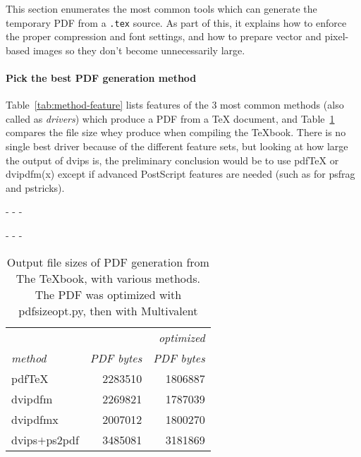 \documentclass{ltugproc}
\def\cmd{\textsf}
\def\pkg{\textsf}
\def\captiontop#1{%
  \advance\abovecaptionskip-\belowcaptionskip
  \advance\belowcaptionskip\abovecaptionskip
  \advance\abovecaptionskip-\belowcaptionskip
  \abovecaptionskip-\abovecaptionskip
  \caption{#1}%
  \advance\abovecaptionskip-\belowcaptionskip
  \advance\belowcaptionskip\abovecaptionskip
  \advance\abovecaptionskip-\belowcaptionskip
  \abovecaptionskip-\abovecaptionskip
}
\begin{document}
This section enumerates the most common tools which can generate the
temporary PDF from a \texttt{.tex} source. As part of this, it explains how
to enforce the proper compression and font settings, and how to
prepare vector and pixel-based images so they don't become unnecessarily
large.

\paragraph{Pick the best PDF generation method}
Table~\ref{tab:method-feature} lists features of the 3 most common methods
(also called as \emph{drivers}) which produce a PDF from a \TeX{} document,
and Table~\ref{tab:texbook-to-pdf} compares the file size whey produce when
compiling the \TeX{}book. There is no single best driver because of the
different feature sets, but looking at how large the output of \cmd{dvips}
is, the preliminary conclusion would be to use pdf\TeX{}
or \cmd{dvipdfm(x)} except if advanced PostScript features are needed (such
as for \pkg{psfrag} and \pkg{pstricks}).

\begin{table}
\captiontop{Output file sizes of PDF generation from The \TeX{}book, with
various methods. The PDF was optimized with \cmd{pdfsizeopt.py}, then with
Multivalent}\label{tab:texbook-to-pdf}
\par\small\noindent\hfil
\begin{tabular}{@{}lrr@{}}
\toprule
                  &&\emph{optimized}\\
\emph{method}     &\emph{PDF bytes}&\emph{PDF bytes}\\\midrule
pdf\TeX           &2283510 &1806887\\
\cmd{dvipdfm}     &2269821 &1787039\\
\cmd{dvipdfmx}    &2007012 &1800270\\
\cmd{dvips}$+$\cmd{ps2pdf}      &3485081 &3181869\\
\bottomrule
\end{tabular}
\end{table}
\end{document}
